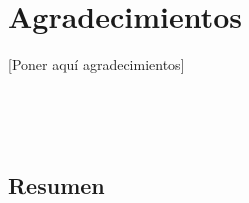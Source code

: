 \chapter*{Agradecimientos}
\thispagestyle{empty}

\vspace{1cm}

[Poner aquí agradecimientos]

\newpage
\begin{center}
{\LARGE\bfseries\titulo}\\
\end{center}
\begin{center}
\autor\
\end{center}

\section*{Resumen}


